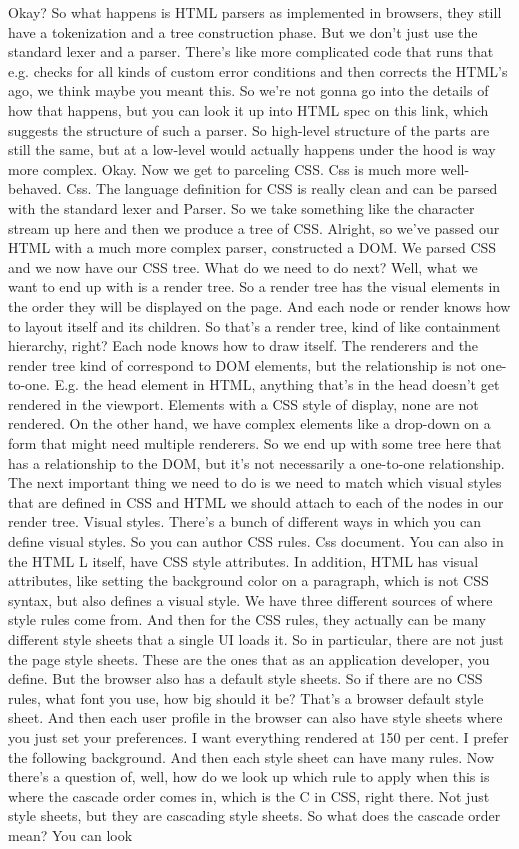 Okay? So what happens is HTML parsers as implemented in browsers, they still have a tokenization and a tree construction phase. But we don't just use the standard lexer and a parser. There's like more complicated code that runs that e.g. checks for all kinds of custom error conditions and then corrects the HTML's ago, we think maybe you meant this. So we're not gonna go into the details of how that happens, but you can look it up into HTML spec on this link, which suggests the structure of such a parser. So high-level structure of the parts are still the same, but at a low-level would actually happens under the hood is way more complex. Okay. Now we get to parceling CSS. Css is much more well-behaved. Css. The language definition for CSS is really clean and can be parsed with the standard lexer and Parser. So we take something like the character stream up here and then we produce a tree of CSS. Alright, so we've passed our HTML with a much more complex parser, constructed a DOM. We parsed CSS and we now have our CSS tree. What do we need to do next? Well, what we want to end up with is a render tree. So a render tree has the visual elements in the order they will be displayed on the page. And each node or render knows how to layout itself and its children. So that's a render tree, kind of like containment hierarchy, right? Each node knows how to draw itself. The renderers and the render tree kind of correspond to DOM elements, but the relationship is not one-to-one. E.g. the head element in HTML, anything that's in the head doesn't get rendered in the viewport. Elements with a CSS style of display, none are not rendered. On the other hand, we have complex elements like a drop-down on a form that might need multiple renderers. So we end up with some tree here that has a relationship to the DOM, but it's not necessarily a one-to-one relationship. The next important thing we need to do is we need to match which visual styles that are defined in CSS and HTML we should attach to each of the nodes in our render tree. Visual styles. There's a bunch of different ways in which you can define visual styles. So you can author CSS rules. Css document. You can also in the HTML L itself, have CSS style attributes. In addition, HTML has visual attributes, like setting the background color on a paragraph, which is not CSS syntax, but also defines a visual style. We have three different sources of where style rules come from. And then for the CSS rules, they actually can be many different style sheets that a single UI loads it. So in particular, there are not just the page style sheets. These are the ones that as an application developer, you define. But the browser also has a default style sheets. So if there are no CSS rules, what font you use, how big should it be? That's a browser default style sheet. And then each user profile in the browser can also have style sheets where you just set your preferences. I want everything rendered at 150 per cent. I prefer the following background. And then each style sheet can have many rules. Now there's a question of, well, how do we look up which rule to apply when this is where the cascade order comes in, which is the C in CSS, right there. Not just style sheets, but they are cascading style sheets. So what does the cascade order mean? You can look 